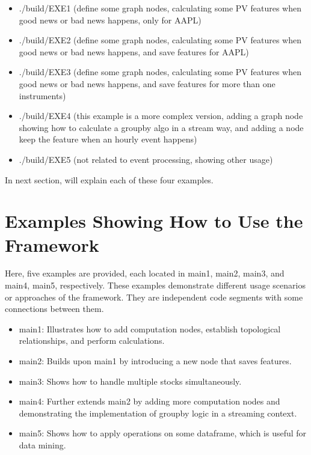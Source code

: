 \documentclass{article}
\begin{document}
\begin{itemize}
  \item ./build/EXE1 (define some graph nodes, calculating some PV features when good news or bad news happens, only for AAPL)\\
  \item ./build/EXE2 (define some graph nodes, calculating some PV features when good news or bad news happens, and save features for AAPL)\\
  \item ./build/EXE3 (define some graph nodes, calculating some PV features when good news or bad news happens, and save features for more than one instruments)\\
  \item ./build/EXE4 (this example is a more complex version, adding a graph node showing how to calculate a groupby algo in a stream way, and adding a node keep the feature when an hourly event happens)\\
  \item ./build/EXE5 (not related to event processing, showing other usage)\\

\end{itemize}


In next section, will explain each of these four examples.




\newpage
\section{Examples Showing How to Use the Framework}

Here, five examples are provided, each located in main1, main2, main3, and main4, main5, respectively. These examples demonstrate different usage scenarios or approaches of the framework. They are independent code segments with some connections between them.



\begin{itemize}
  \item main1: Illustrates how to add computation nodes, establish topological relationships, and perform calculations.
  \item main2: Builds upon main1 by introducing a new node that saves features.
  \item main3: Shows how to handle multiple stocks simultaneously.
  \item main4: Further extends main2 by adding more computation nodes and demonstrating the implementation of groupby logic in a streaming context.
  \item main5: Shows how to apply operations on some dataframe, which is useful for data mining.
\end{itemize}
\end{document}

